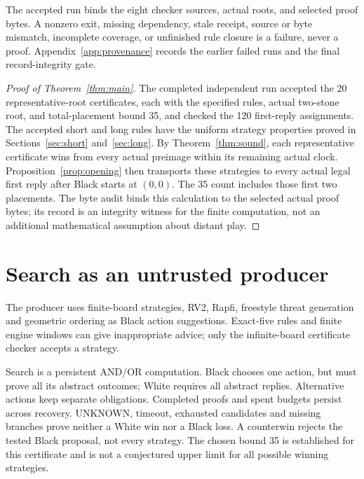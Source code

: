\documentclass[11pt]{article}
\theoremstyle{definition}
\theoremstyle{remark}
\begin{document}
The accepted run binds the eight checker sources, actual roots, and selected
proof bytes. A nonzero exit, missing dependency, stale receipt, source or
byte mismatch, incomplete coverage, or unfinished rule closure is a failure,
never a proof. Appendix~\ref{app:provenance} records the earlier failed runs
and the final record-integrity gate.

\begin{proof}[Proof of Theorem~\ref{thm:main}]
The completed independent run accepted the 20 representative-root
certificates, each with the specified rules, actual two-stone root,
and total-placement bound 35, and checked the 120 first-reply assignments.
The accepted short and long rules have the uniform strategy properties
proved in Sections~\ref{sec:short} and~\ref{sec:long}. By
Theorem~\ref{thm:sound}, each representative certificate wins from every
actual preimage within its remaining actual clock. Proposition~\ref{prop:opening}
then transports these strategies to every actual legal first reply after
Black starts at $(0,0)$. The 35 count includes those first two placements.
The byte audit binds this calculation to the selected actual proof bytes;
its record is an integrity witness for the finite computation, not an
additional mathematical assumption about distant play.
\end{proof}


\section{Search as an untrusted producer}\label{sec:search}
The producer uses finite-board strategies, RV2, Rapfi, freestyle threat
generation and geometric ordering as Black action suggestions. Exact-five
rules and finite engine windows can give inappropriate advice; only the
infinite-board certificate checker accepts a strategy.

Search is a persistent AND/OR computation. Black chooses one action, but
must prove all its abstract outcomes; White requires all abstract replies.
Alternative actions keep separate obligations. Completed proofs and spent
budgets persist across recovery. UNKNOWN, timeout, exhausted candidates and
missing branches prove neither a White win nor a Black loss. A counterwin
rejects the tested Black proposal, not every strategy. The chosen bound 35
is established for this certificate and is not a conjectured upper limit
for all possible winning strategies.
\end{document}
